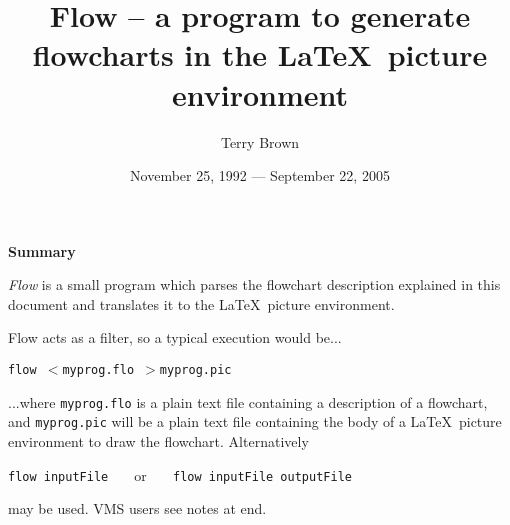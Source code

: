 

\setlength{\unitlength}{2em} %

\setlength{\parindent}{0pt}
\setlength{\parskip}{2ex}
\addtolength{\topmargin}{-1cm}
\addtolength{\textheight}{2cm}
\addtolength{\evensidemargin}{-1cm}
\addtolength{\oddsidemargin}{-1cm}
\addtolength{\textwidth}{2cm}
\newcommand{\headA}[1]{{\huge \vspace{1ex} \bf \hfill #1 \vspace{1ex}\hfill}}
\newcommand{\headB}[1]{{\Large \vspace{1ex} \bf #1 \vspace{1ex} }}
\newcommand{\headC}[1]{{\large \vspace{1ex} \bf #1 \vspace{1ex} }}
\newcommand{\headD}[1]{{\bf \vspace{1ex} #1 \vspace{1ex} }}

\newcommand{\pushin}{\hspace*{1em}}



\title{Flow -- a program to generate flowcharts in the \LaTeX\
       picture environment}
\author{Terry Brown}
\date{November 25, 1992 --- September 22, 2005}
\maketitle

\headB{Summary}


{\em Flow\/} is a small program which parses the flowchart description
explained in this document and translates it to the \LaTeX\ picture
environment.

Flow acts as a filter, so a typical execution would be...

\verb+flow +$<$\verb+myprog.flo +$>$\verb+myprog.pic+

...where \verb+myprog.flo+ is a plain text file containing a description of a
flowchart, and \verb+myprog.pic+ will be a plain text file containing the
body of a \LaTeX\ picture environment to draw the flowchart.  Alternatively

\verb+flow inputFile   + or \verb+   flow inputFile outputFile+

may be used.  VMS users see notes at end.

